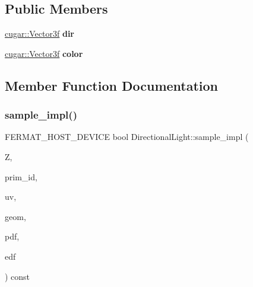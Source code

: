 \subsection*{Public Members}
\begin{DoxyCompactItemize}
\item 
\mbox{\label{struct_directional_light_ae53baeb58a17876a8cdb9f6df60ca5c0}} 
\hyperlink{structcugar_1_1_vector}{cugar\+::\+Vector3f} {\bfseries dir}
\item 
\mbox{\label{struct_directional_light_a0baf7b8cb5a7b58e8724c159c4849651}} 
\hyperlink{structcugar_1_1_vector}{cugar\+::\+Vector3f} {\bfseries color}
\end{DoxyCompactItemize}


\subsection{Member Function Documentation}
\mbox{\label{struct_directional_light_af94d1e48aece7a3811f791fdabcbb11d}} 
\subsubsection{\texorpdfstring{sample\+\_\+impl()}{sample\_impl()}\hspace{0.1cm}{\footnotesize\ttfamily [1/2]}}
{\footnotesize\ttfamily F\+E\+R\+M\+A\+T\+\_\+\+H\+O\+S\+T\+\_\+\+D\+E\+V\+I\+CE bool Directional\+Light\+::sample\+\_\+impl (\begin{DoxyParamCaption}\item[{const float $\ast$}]{Z,  }\item[{uint32\+\_\+t $\ast$}]{prim\+\_\+id,  }\item[{\hyperlink{structcugar_1_1_vector}{cugar\+::\+Vector2f} $\ast$}]{uv,  }\item[{\hyperlink{struct_vertex_geometry}{Vertex\+Geometry} $\ast$}]{geom,  }\item[{float $\ast$}]{pdf,  }\item[{\hyperlink{struct_edf}{Edf} $\ast$}]{edf }\end{DoxyParamCaption}) const\hspace{0.3cm}{\ttfamily [inline]}}

